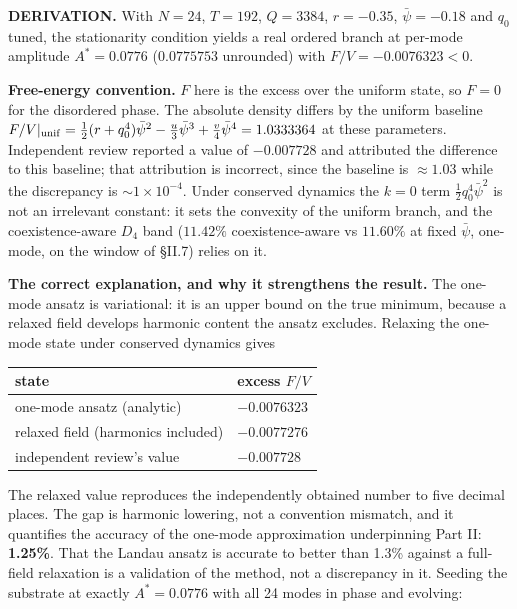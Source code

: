 \documentclass[a4paper,11pt]{article}
\begin{document}
\textbf{DERIVATION.} With $N=24$, $T=192$, $Q=3384$, $r=-0.35$, $\bar\psi=-0.18$ and $q_0$ tuned, the stationarity condition yields a real ordered branch at per-mode amplitude $A^{*}=0.0776$ ($0.0775753$ unrounded) with $F/V=-0.0076323<0$.

\textbf{Free-energy convention.} $F$ here is the excess over the uniform state, so $F=0$ for the disordered phase. The absolute density differs by the uniform baseline $F/V|_{\rm unif}=\tfrac12(r+q_0^4)\bar\psi^2-\tfrac u3\bar\psi^3+\tfrac v4\bar\psi^4=1.0333364$ at these parameters. Independent review reported a value of $-0.007728$ and attributed the difference to this baseline; that attribution is incorrect, since the baseline is $\approx1.03$ while the discrepancy is $\sim1\times10^{-4}$. Under conserved dynamics the $k=0$ term $\tfrac12q_0^4\bar\psi^2$ is not an irrelevant constant: it sets the convexity of the uniform branch, and the coexistence-aware $D_4$ band ($11.42\%$ coexistence-aware vs $11.60\%$ at fixed $\bar\psi$, one-mode, on the window of §II.7) relies on it.

\textbf{The correct explanation, and why it strengthens the result.} The one-mode ansatz is variational: it is an upper bound on the true minimum, because a relaxed field develops harmonic content the ansatz excludes. Relaxing the one-mode state under conserved dynamics gives

\begin{center}
\begin{tabular}{ll}
\hline
state & excess $F/V$ \\
\hline
one-mode ansatz (analytic) & $-0.0076323$ \\
relaxed field (harmonics included) & \textbf{$-0.0077276$} \\
independent review's value & $-0.007728$ \\
\hline
\end{tabular}
\end{center}

The relaxed value reproduces the independently obtained number to five decimal places. The gap is harmonic lowering, not a convention mismatch, and it quantifies the accuracy of the one-mode approximation underpinning Part II: \textbf{1.25\%}. That the Landau ansatz is accurate to better than 1.3\% against a full-field relaxation is a validation of the method, not a discrepancy in it. Seeding the substrate at exactly $A^*=0.0776$ with all 24 modes in phase and evolving:
\end{document}
